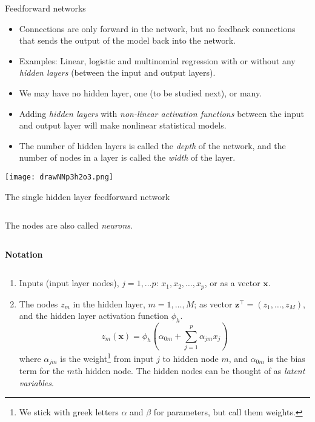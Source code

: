 \documentclass[10pt,ignorenonframetext,]{beamer}
\providecommand{\tightlist}{%
  \setlength{\itemsep}{0pt}\setlength{\parskip}{0pt}}
\begin{document}
\begin{frame}{Feedforward networks}
\protect\hypertarget{feedforward-networks}{}

\begin{itemize}
\item
  Connections are only forward in the network, but no feedback
  connections that sends the output of the model back into the network.
\item
  Examples: Linear, logistic and multinomial regression with or without
  any \emph{hidden layers} (between the input and output layers).
\item
  We may have no hidden layer, one (to be studied next), or many.
\item
  Adding \emph{hidden layers} with \emph{non-linear activation
  functions} between the input and output layer will make nonlinear
  statistical models.
\item
  The number of hidden layers is called the \emph{depth} of the network,
  and the number of nodes in a layer is called the \emph{width} of the
  layer.
\end{itemize}

\end{frame}

\begin{frame}

\centering

\texttt{[image: drawNNp3h2o3.png]}

\end{frame}

\begin{frame}

\begin{block}{The single hidden layer feedforward network}

\(~\)

The nodes are also called \emph{neurons}.

\(~\)

\textbf{Notation}

\(~\)

\begin{enumerate}
\tightlist
\item
  Inputs (input layer nodes), \(j=1,\dots p\):
  \(x_1, x_2, \ldots, x_p\), or as a vector \({\boldsymbol x}\).
\item
  The nodes \(z_m\) in the hidden layer, \(m=1,\ldots, M\); as vector
  \({\boldsymbol z}^\top=(z_1, \ldots, z_M)\), and the hidden layer
  activation function \(\phi_h\). \[
  z_m({\boldsymbol x})=\phi_h(\alpha_{0m}+\sum_{j=1}^p \alpha_{jm}x_{j})
  \] where \(\alpha_{jm}\) is the
  weight\footnote{We stick with greek letters $\alpha$ and $\beta$ for parameters, but call them weights.}
  from input \(j\) to hidden node \(m\), and \(\alpha_{0m}\) is the bias
  term for the \(m\)th hidden node. The hidden nodes can be thought of
  as \emph{latent variables}.
\end{enumerate}

\end{block}

\end{frame}
\end{document}
